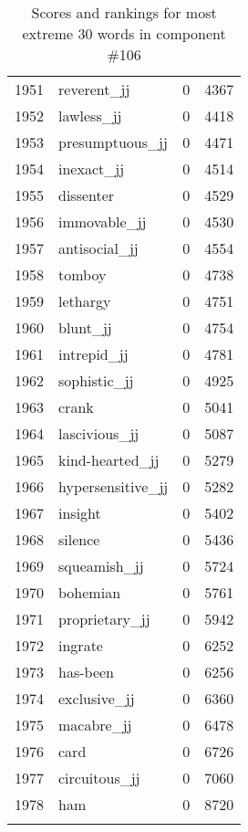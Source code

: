 \begin{longtable}[!htbp]{| rlr@{.}l |}
    1951 & reverent\_jj & 0 & 4367 \\
    1952 & lawless\_jj & 0 & 4418 \\
    1953 & presumptuous\_jj & 0 & 4471 \\
    1954 & inexact\_jj & 0 & 4514 \\
    1955 & dissenter & 0 & 4529 \\
    1956 & immovable\_jj & 0 & 4530 \\
    1957 & antisocial\_jj & 0 & 4554 \\
    1958 & tomboy & 0 & 4738 \\
    1959 & lethargy & 0 & 4751 \\
    1960 & blunt\_jj & 0 & 4754 \\
    1961 & intrepid\_jj & 0 & 4781 \\
    1962 & sophistic\_jj & 0 & 4925 \\
    1963 & crank & 0 & 5041 \\
    1964 & lascivious\_jj & 0 & 5087 \\
    1965 & kind-hearted\_jj & 0 & 5279 \\
    1966 & hypersensitive\_jj & 0 & 5282 \\
    1967 & insight & 0 & 5402 \\
    1968 & silence & 0 & 5436 \\
    1969 & squeamish\_jj & 0 & 5724 \\
    1970 & bohemian & 0 & 5761 \\
    1971 & proprietary\_jj & 0 & 5942 \\
    1972 & ingrate & 0 & 6252 \\
    1973 & has-been & 0 & 6256 \\
    1974 & exclusive\_jj & 0 & 6360 \\
    1975 & macabre\_jj & 0 & 6478 \\
    1976 & card & 0 & 6726 \\
    1977 & circuitous\_jj & 0 & 7060 \\
    1978 & ham & 0 & 8720 \\
    \hline
    \caption{Scores and rankings for most extreme 30 words in component \#106} \\
\end{longtable}
